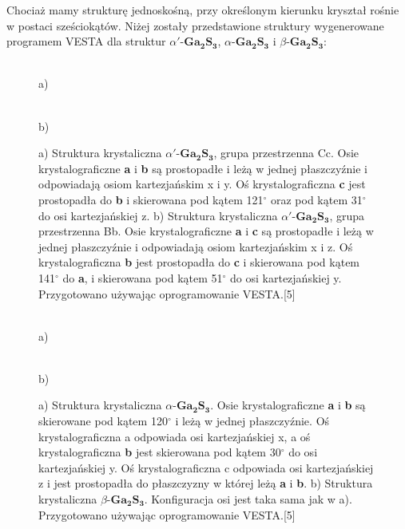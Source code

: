 Chociaż mamy strukturę jednoskośną, przy określonym kierunku kryształ rośnie w postaci sześciokątów. Niżej zostały przedstawione struktury wygenerowane programem VESTA dla struktur $\alpha'$-$\mathbf{Ga_{2}S_{3}}$, $\alpha$-$\mathbf{Ga_{2}S_{3}}$ i  $\beta$-$\mathbf{Ga_{2}S_{3}}$:

\begin{center}
	\begin{figure}[H]
		\begin{minipage}[h]{0.47\linewidth}
			 \\a)
		\end{minipage}
		\hfill
		\begin{minipage}[h]{0.47\linewidth}
			 \\b)
		\end{minipage}
		\caption{a) Struktura krystaliczna $\alpha'$-$\mathbf{Ga_{2}S_{3}}$, grupa przestrzenna Cc. Osie krystalograficzne \textbf{a} i \textbf{b} są prostopadłe i leżą w jednej płaszczyźnie i odpowiadają osiom kartezjańskim x i y. Oś krystalograficzna \textbf{c} jest prostopadła do \textbf{b} i skierowana pod kątem 121$^{\circ}$ oraz pod kątem 31$^{\circ}$ do osi kartezjańskiej z. b) Struktura krystaliczna $\alpha'$-$\mathbf{Ga_{2}S_{3}}$, grupa przestrzenna Bb. Osie krystalograficzne \textbf{a} i \textbf{c} są prostopadłe i leżą w jednej płaszczyźnie i odpowiadają osiom kartezjańskim x i z. Oś krystalograficzna \textbf{b} jest prostopadła do \textbf{c} i skierowana pod kątem 141$^{\circ}$ do \textbf{a}, i skierowana pod kątem 51$^{\circ}$ do osi kartezjańskiej y. Przygotowano używając oprogramowanie VESTA.[5]}
	\end{figure}
\end{center}

\begin{center}
	\begin{figure}[H]
		\begin{minipage}[h]{0.47\linewidth}
			 \\a)
		\end{minipage}
		\hfill
		\begin{minipage}[h]{0.47\linewidth}
			 \\b)
		\end{minipage}
		\caption{a) Struktura krystaliczna $\alpha$-$\mathbf{Ga_{2}S_{3}}$. Osie krystalograficzne \textbf{a} i \textbf{b} są skierowane pod kątem 120$^{\circ}$ i leżą w jednej płaszczyźnie. Oś krystalograficzna a odpowiada osi kartezjańskiej x, a oś krystalograficzna \textbf{b} jest skierowana pod kątem 30$^{\circ}$ do osi kartezjańskiej y. Oś krystalograficzna c odpowiada osi kartezjańskiej z i jest prostopadła do płaszczyzny w której leżą \textbf{a} i \textbf{b}. b) Struktura krystaliczna $\beta$-$\mathbf{Ga_{2}S_{3}}$. Konfiguracja osi jest taka sama jak w a). Przygotowano używając oprogramowanie VESTA.[5]}
	\end{figure}
\end{center}
	
